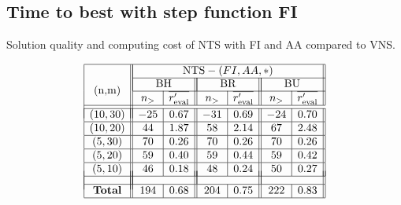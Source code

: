 \documentclass{acm_proc_article-sp}
\begin{document}
\subsection{Time to best with step function FI}

\begin{table}[htb!]
\caption{Solution quality and computing cost of NTS with FI and AA compared to VNS.}
\label{tab:fiaa}
\vspace{-3ex}
$$
\begin{array}{|c||c|c||c|c||c|c||}
\hline
\multirow{4}{*}{(n,m)} &\multicolumn{6}{|c||}{\textrm{NTS}-(FI,AA,*)} \\
\cline{2-7}
& \multicolumn{2}{|c||}{\textrm{BH}} & \multicolumn{2}{|c||}{\textrm{BR}} & \multicolumn{2}{|c||}{\textrm{BU}} \\ \cline{2-7}


 & n_{>} & \overline{r'_{\textrm{eval}}} & n_{>} & \overline{r'_{\textrm{eval}}}  & n_{>} & \overline{r'_{\textrm{eval}}} \\ 
 \cline{1-7}
 \\[-9 pt] 
\cline{1-7}

(10,30) & -25 & 0.67 & -31 & 0.69 & -24 & 0.70  \\ \hline 
(10,20) & 44 & 1.87 & 58 & 2.14 & 67 & 2.48 \\ \hline
(5,30) & 70 & 0.26 & 70 & 0.26 & 70 & 0.26 \\ \hline 
(5,20) & 59 & 0.40 & 59 & 0.44 & 59 & 0.42  \\ \hline
(5,10) & 46 & 0.18 & 48 & 0.24 & 50 & 0.27 \\ \hline\\[-17 pt]
& \multicolumn{2}{|c||}{ } & \multicolumn{2}{|c||}{ } & \multicolumn{2}{|c||}{ } \\ \hline
\textrm{\textbf{Total}} & 194 & 0.68 & 204 & 0.75 & 222 & 0.83 \\ \hline
\end{array}
$$
\end{table}
\end{document}
